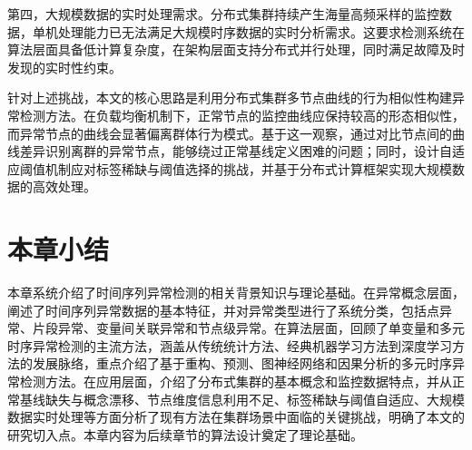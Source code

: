 第四，大规模数据的实时处理需求。分布式集群持续产生海量高频采样的监控数据，单机处理能力已无法满足大规模时序数据的实时分析需求\cite{boniol2022dads}。这要求检测系统在算法层面具备低计算复杂度，在架构层面支持分布式并行处理，同时满足故障及时发现的实时性约束。

针对上述挑战，本文的核心思路是利用分布式集群多节点曲线的行为相似性构建异常检测方法。在负载均衡机制下，正常节点的监控曲线应保持较高的形态相似性，而异常节点的曲线会显著偏离群体行为模式。基于这一观察，通过对比节点间的曲线差异识别离群的异常节点，能够绕过正常基线定义困难的问题；同时，设计自适应阈值机制应对标签稀缺与阈值选择的挑战，并基于分布式计算框架实现大规模数据的高效处理。

\section{本章小结}

本章系统介绍了时间序列异常检测的相关背景知识与理论基础。在异常概念层面，阐述了时间序列异常数据的基本特征，并对异常类型进行了系统分类，包括点异常、片段异常、变量间关联异常和节点级异常。在算法层面，回顾了单变量和多元时序异常检测的主流方法，涵盖从传统统计方法、经典机器学习方法到深度学习方法的发展脉络，重点介绍了基于重构、预测、图神经网络和因果分析的多元时序异常检测方法。在应用层面，介绍了分布式集群的基本概念和监控数据特点，并从正常基线缺失与概念漂移、节点维度信息利用不足、标签稀缺与阈值自适应、大规模数据实时处理等方面分析了现有方法在集群场景中面临的关键挑战，明确了本文的研究切入点。本章内容为后续章节的算法设计奠定了理论基础。
